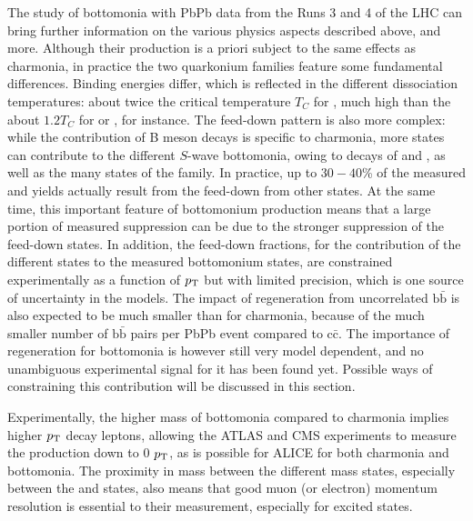 \documentclass[../report.tex]{subfiles}
\providecommand{\pt}{\ensuremath{p_\text{T}}\Xspace}
\begin{document}
The study of bottomonia with PbPb data from the Runs 3 and 4 of the LHC can bring further information on the various physics aspects described above, and more.
Although their production is a priori subject to the same effects as charmonia, in practice the two quarkonium families feature some fundamental differences.
Binding energies differ, which is reflected in the different dissociation temperatures: about twice the critical temperature $T_C$ for , much high than the about
$1.2 T_C$ for \PJgy or , for instance. The feed-down pattern is also more complex: while the contribution of B meson decays is specific to charmonia, more states can
contribute to the different $S$-wave bottomonia, owing to decays of  and , as well as the many states of the \PGcb family. In practice, up to $30-40$\% of the measured 
 and  yields actually result from the feed-down from other states. At the same time, this important feature of bottomonium production means that
a large portion of measured  suppression can be due to the stronger suppression of the feed-down states.
In addition, the feed-down fractions, for the contribution of the 
different states to the measured bottomonium states, are constrained experimentally as a function of $\pt$ but with limited precision, which is one source of uncertainty in the models.
The impact of regeneration from uncorrelated $\text{b}\bar{\text{b}}$ is also expected to be much smaller than for charmonia, because of the much smaller number of $\text{b}\bar{\text{b}}$
pairs per PbPb event compared to $\text{c}\bar{\text{c}}$. The importance of regeneration for bottomonia is however still very model dependent, and no unambiguous experimental signal
for it has been found yet. Possible ways of constraining this contribution will be discussed in this section.

Experimentally, the higher mass of bottomonia compared to charmonia implies higher $\pt$ decay leptons, allowing the ATLAS and CMS experiments to measure the production down to 0 $\pt$,
as is possible for ALICE for both charmonia and bottomonia. The proximity in mass between the different mass states, especially between the  and  states, also 
means that good muon (or electron) momentum resolution is essential to their measurement, especially for excited states. 
\end{document}
